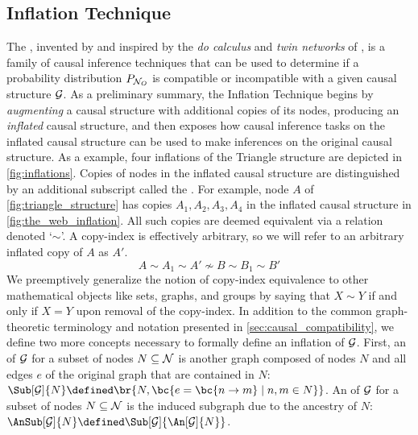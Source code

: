 \documentclass[aps, 10pt, english, twoside, pra, nofootinbib, tightenlines, longbibliography, superscriptaddress]{revtex4-1}
\begin{document}
    \subsection{Inflation Technique}
    \label{sec:deriving_inequalities}
    \label{sec:inflation_technique_main_summary}
    The , invented by \citet{Inflation} and inspired by the \textit{do calculus} and \textit{twin networks} of \citet{Pearl_2009}, is a family of causal inference techniques that can be used to determine if a probability distribution $\prob[\nodes_{O}]$ is compatible or incompatible with a given causal structure $\mathcal{G}$. As a preliminary summary, the Inflation Technique begins by \textit{augmenting} a causal structure with additional copies of its nodes, producing an \textit{inflated} causal structure, and then exposes how causal inference tasks on the inflated causal structure can be used to make inferences on the original causal structure. As a example, four inflations of the Triangle structure are depicted in \cref{fig:inflations}. Copies of nodes in the inflated causal structure are distinguished by an additional subscript called the . For example, node $A$ of \cref{fig:triangle_structure} has copies $A_1, A_2, A_3, A_4$ in the inflated causal structure in \cref{fig:the_web_inflation}. All such copies are deemed equivalent via a  relation denoted `$\sim$'. A copy-index is effectively arbitrary, so we will refer to an arbitrary inflated copy of $A$ as $A'$.
    \[ A \sim A_1 \sim A' \not\sim B \sim B_1 \sim B' \]
    We preemptively generalize the notion of copy-index equivalence to other mathematical objects like sets, graphs, and groups by saying that $X \sim Y$ if and only if $X = Y$ upon removal of the copy-index. In addition to the common graph-theoretic terminology and notation presented in \cref{sec:causal_compatibility}, we define two more concepts necessary to formally define an inflation of $\mathcal{G}$. First, an  of $\mathcal{G}$ for a subset of nodes $N \subseteq \mathcal{N}$ is another graph composed of nodes $N$ and all edges $e$ of the original graph that are contained in $N$: $\Sub[\graph]{N} \defined \br{N, \bc{e = \bc{n \to m} \mid n, m \in N}}$. An  of $\mathcal{G}$ for a subset of nodes $N \subseteq \mathcal{N}$ is the induced subgraph due to the ancestry of $N$: $\AnSub[\graph]{N} \defined \Sub[\graph]{\An[\graph]{N}}$.
\end{document}
